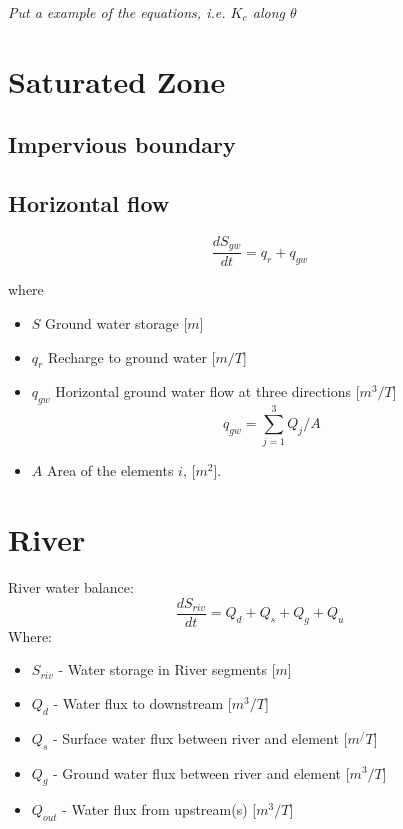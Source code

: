 \documentclass[]{scrbook}
\providecommand{\tightlist}{%
  \setlength{\itemsep}{0pt}\setlength{\parskip}{0pt}}
\begin{document}
\emph{Put a example of the equations, i.e. \(K_e\) along \(\theta\)}

\chapter{Saturated Zone}\label{gw}

\section{Impervious boundary}\label{impervious-boundary}

\section{Horizontal flow}\label{horizontal-flow}

\[ \frac {dS_{gw}}{dt} = q_r + q_{gw}\]

where

\begin{itemize}
\tightlist
\item
  \(S\) Ground water storage {[}\(m\){]}
\item
  \(q_r\) Recharge to ground water {[}\(m/T\){]}
\item
  \(q_{gw}\) Horizontal ground water flow at three directions
  {[}\(m^3/T\){]} \[q_{gw} = \sum_{j=1}^3 Q_{j} / A\]
\item
  \(A\) Area of the elements \(i\), {[}\(m^2\){]}.
\end{itemize}

\chapter{River}\label{Riv}

River water balance: \[
  \frac{d S_{riv}}{d t} = Q_{d} + Q_{s} + Q_{g} + Q_{u}
\] Where:

\begin{itemize}
\tightlist
\item
  \(S_{riv}\) - Water storage in River segments {[}\(m\){]}
\item
  \(Q_{d}\) - Water flux to downstream {[}\(m^3/T\){]}
\item
  \(Q_{s}\) - Surface water flux between river and element
  {[}\(m^/T\){]}
\item
  \(Q_{g}\) - Ground water flux between river and element
  {[}\(m^3/T\){]}
\item
  \(Q_{out}\) - Water flux from upstream(s) {[}\(m^3/T\){]}
\end{itemize}
\end{document}
